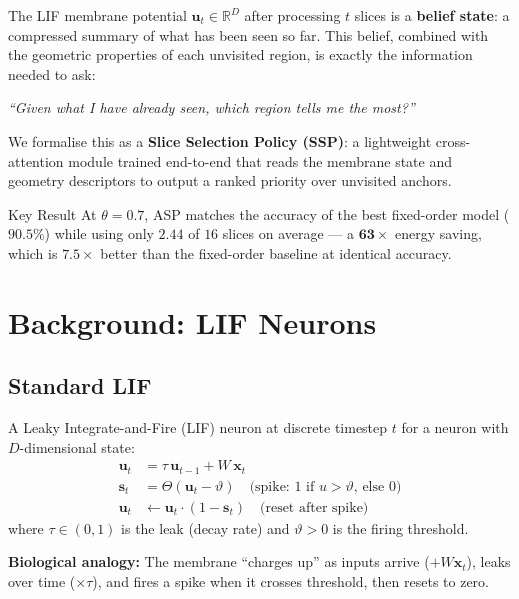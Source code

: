 \documentclass[11pt,a4paper]{article}
\begin{document}
The LIF membrane potential $\mathbf{u}_t \in \mathbb{R}^D$ after processing
$t$ slices is a \textbf{belief state}: a compressed summary of what has been
seen so far.  This belief, combined with the geometric properties of each
unvisited region, is exactly the information needed to ask:
\begin{center}
  \emph{``Given what I have already seen, which region tells me the most?''}
\end{center}
We formalise this as a \textbf{Slice Selection Policy (SSP)}: a lightweight
cross-attention module trained end-to-end that reads the membrane state and
geometry descriptors to output a ranked priority over unvisited anchors.

\begin{keybox}{Key Result}
At $\theta = 0.7$, ASP matches the accuracy of the best fixed-order model
($90.5\%$) while using only $\mathbf{2.44}$ of $16$ slices on average ---
a $\mathbf{63\times}$ energy saving, which is $7.5\times$ better than the
fixed-order baseline at identical accuracy.
\end{keybox}

\section{Background: LIF Neurons}

\subsection{Standard LIF}

A Leaky Integrate-and-Fire (LIF) neuron at discrete timestep $t$ for a neuron
with $D$-dimensional state:
\begin{align}
  \mathbf{u}_t &= \tau\,\mathbf{u}_{t-1} + W\,\mathbf{x}_t
    \label{eq:lif_integrate}\\
  \mathbf{s}_t &= \Theta(\mathbf{u}_t - \vartheta)
    \quad \text{(spike: 1 if $u > \vartheta$, else 0)}
    \label{eq:lif_spike}\\
  \mathbf{u}_t &\leftarrow \mathbf{u}_t \cdot (1 - \mathbf{s}_t)
    \quad \text{(reset after spike)}
    \label{eq:lif_reset}
\end{align}
where $\tau \in (0,1)$ is the leak (decay rate) and $\vartheta > 0$ is the
firing threshold.

\textbf{Biological analogy:} The membrane ``charges up'' as inputs arrive
($+W\mathbf{x}_t$), leaks over time ($\times\tau$), and fires a spike when
it crosses threshold, then resets to zero.
\end{document}

